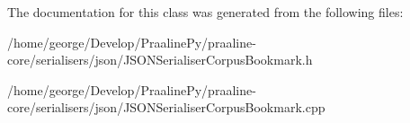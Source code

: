 The documentation for this class was generated from the following files\+:\begin{DoxyCompactItemize}
\item 
/home/george/\+Develop/\+Praaline\+Py/praaline-\/core/serialisers/json/J\+S\+O\+N\+Serialiser\+Corpus\+Bookmark.\+h\item 
/home/george/\+Develop/\+Praaline\+Py/praaline-\/core/serialisers/json/J\+S\+O\+N\+Serialiser\+Corpus\+Bookmark.\+cpp\end{DoxyCompactItemize}

